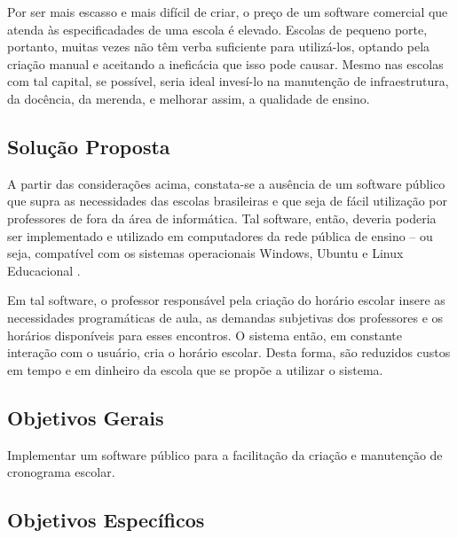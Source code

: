 \documentclass[12pt,a4paper]{article}
\begin{document}
		\par Por ser mais escasso e mais difícil de criar, o preço de um software comercial que atenda às especificadades de uma escola é elevado. Escolas de pequeno porte, portanto, muitas vezes não têm verba suficiente para utilizá-los, optando pela criação manual e aceitando a ineficácia que isso pode causar. Mesmo nas escolas com tal capital, se possível, seria ideal invesí-lo na manutenção de infraestrutura, da docência, da merenda, e melhorar assim, a qualidade de ensino.

		\subsection{Solução Proposta}

			 \par A partir das considerações acima, constata-se a ausência de um software público \cite{publico} que supra as necessidades das escolas brasileiras e que seja de fácil utilização por professores de fora da área de informática. Tal software, então, deveria poderia ser implementado e utilizado em computadores da rede pública de ensino -- ou seja, compatível com os sistemas operacionais Windows, Ubuntu e Linux Educacional \cite{proinfo, w3s}.

			 \par Em tal software, o professor responsável pela criação do horário escolar insere as necessidades programáticas de aula, as demandas subjetivas dos professores e os horários disponíveis para esses encontros. O sistema então, em constante interação com o usuário, cria o horário escolar.  Desta forma, são reduzidos custos em tempo e em dinheiro da escola que se propõe a utilizar o sistema.

		\subsection{Objetivos Gerais}

			\par Implementar um software público para a facilitação da criação e manutenção de cronograma escolar.


		\subsection{Objetivos Específicos}
\end{document}
